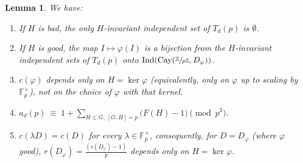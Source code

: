 \documentclass{article}
\theoremstyle{plain}
\newtheorem{lemma}[theorem]{Lemma}
\theoremstyle{definition}
\theoremstyle{remark}
\newcommand{\Z}{\mathbb{Z}}
\newcommand{\F}{\mathbb{F}}
\DeclareMathOperator{\Cay}{Cay}
\DeclareMathOperator{\Ind}{Ind}
\begin{document}
\begin{lemma}\label{lem:reduction}
We have:
\begin{enumerate}
\item If $H$ is bad, the only $H$-invariant independent set of $T_d(p)$ is $\emptyset$.
\item If $H$ is good, the map $I\mapsto\varphi(I)$ is a bijection from the $H$-invariant independent sets of $T_d(p)$ onto $\Ind(\Cay(\sfrac{\Z}{p\Z}, D_\varphi))$.
\item $c(\varphi)$ depends only on $H=\ker\varphi$ (equivalently, only on $\varphi$ up to scaling by $\F_p^\times$), not on the choice of $\varphi$ with that kernel.
\item $\displaystyle a_d(p)\ \equiv\ 1+\sum_{H\le G,\ [G:H]=p}\big(F(H)-1\big)\pmod{p^2}$.
\item $c(\lambda D)=c(D)$ for every $\lambda\in\F_p^\times$, consequently, for $D=D_\varphi$ (where $\varphi$ good), $r(D_\varphi)=\frac{(c(D_\varphi)-1)}{p}$ depends only on $H=\ker\varphi$.
\end{enumerate}
\end{lemma}
\end{document}
